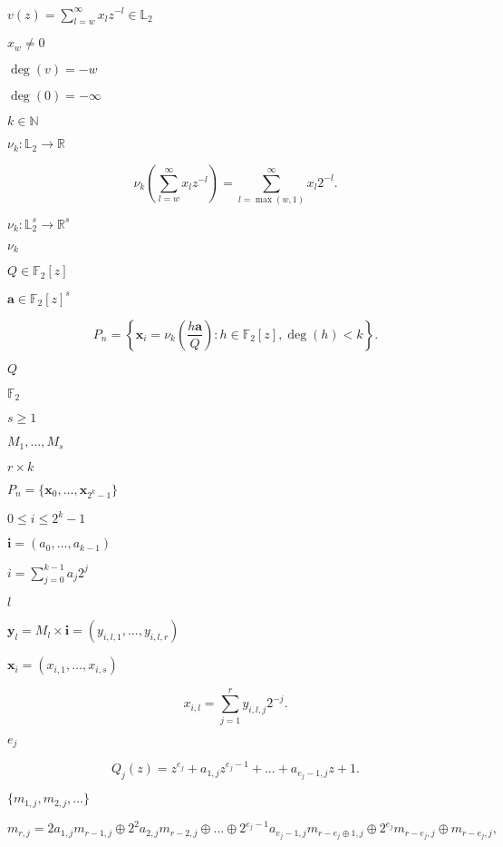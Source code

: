 \documentclass{article}
\begin{document}
$v(z) = \sum_{l = w}^{\infty} x_l z^{-l} \in \mathbb L_2$
\pagebreak

$x_w \neq 0$
\pagebreak

$\deg(v) = - w $
\pagebreak

$\deg(0) = - \infty$
\pagebreak

$k \in \mathbb N$
\pagebreak

$ {\nu}_k: \mathbb L_2 \rightarrow \mathbb R $
\pagebreak

\[    {\nu}_k\left(\sum_{l = w}^{\infty} x_l z^{-l}\right) = \sum_{l = \max(w, 1)}^{\infty} x_l 2^{-l}.
\]
\pagebreak

$ {\nu}_k: \mathbb L_2^s \rightarrow \mathbb R^s $
\pagebreak

${\nu}_k$
\pagebreak

$Q \in \mathbb F_2[z]$
\pagebreak

$ \boldsymbol a \in \mathbb F_2[z]^s $
\pagebreak

\[P_n = \left\{\boldsymbol x_i = {\nu}_k\left(\frac{h \boldsymbol a}{Q}\right): h \in \mathbb{F}_2[z], \deg(h) < k \right\}.
\]
\pagebreak

$Q$
\pagebreak

$\mathbb{F}_2$
\pagebreak

$s \geq 1$
\pagebreak

$M_1, \dots, M_s$
\pagebreak

$r \times k$
\pagebreak

$P_n = \{\boldsymbol x_0, \dots, \boldsymbol x_{2^k-1} \}$
\pagebreak

$0 \leq i \leq 2^k-1$
\pagebreak

$ \boldsymbol i = (a_0, \dots, a_{k-1})$
\pagebreak

$i = \sum_{j=0}^{k-1} a_j 2^j$
\pagebreak

$l$
\pagebreak

$ \boldsymbol y_l= M_l \times \boldsymbol i = (y_{i, l, 1}, \dots,y_{i, l, r})$
\pagebreak

$\boldsymbol x_i = (x_{i, 1}, \dots, x_{i, s})$
\pagebreak

\[x_{i, l} = \sum_{j=1}^{r} y_{i, l, j}2^{-j}.
\]
\pagebreak

$e_j$
\pagebreak

\[    Q_j(z) = z^{e_j} + a_{1, j} z^{e_j - 1} + \dots + a_{e_j - 1, j} z + 1.
\]
\pagebreak

$\{m_{1,j}, m_{2,j}, \dots\}$
\pagebreak

\[    m_{r, j} = 2 a_{1,j} m_{r-1, j} \oplus 2^2 a_{2,j} m_{r-2, j} \oplus \dots \oplus 2^{e_j - 1} a_{e_j-1, j} m_{r-e_j \oplus 1, j} \oplus 2^{e_j} m_{r - e_j, j} \oplus m_{r-e_j,j},
\]
\pagebreak
\end{document}
